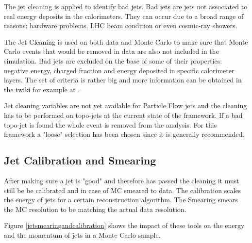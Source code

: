 The jet cleaning is applied to identify bad jets. Bad jets are jets not associated to real energy deposits in the calorimeters. They can occur due to a broad range of reasons: hardware problems, LHC beam condition or even cosmic-ray showers.

The Jet Cleaning is used on both data and Monte Carlo to make sure that Monte Carlo events that would be removed in data are also not included in the simulation.
Bad jets are excluded on the base of some of their properties: negative energy, charged fraction and energy deposited in specific calorimeter layers. The set of criteria is rather big and more information can be obtained in the twiki for example at \cite{jetcleaning}.

Jet cleaning variables are not yet available for Particle Flow jets and the cleaning has to be performed on topo-jets at the current state of the framework. If a bad topo-jet is found the whole event is removed from the analysis.
For this framework a "loose" \cite{jetcleaning} selection has been chosen since it is generally recommended.

\subsection{Jet Calibration and Smearing}

After making sure a jet is "good" and therefore has passed the cleaning it must still be be calibrated and in case of MC smeared to data. The calibration scales the energy of jets for a certain reconstruction algorithm. The Smearing smears the MC resolution to be matching the actual data resolution.

Figure \ref{jetsmearingandcalibration} shows the impact of these tools on the energy and the momentum of jets in a Monte Carlo sample.


